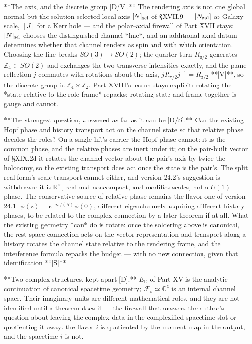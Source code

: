 **The axis, and the discrete group [D/V].** The rendering axis is not one global normal but the solution-selected local axis $[N]_{\rm sel}$ of §XVII.9 — $[N_{\rm gal}]$ at Galaxy scale, $[J]$ for a Kerr hole — and the polar–axial firewall of Part XVII stays: $[N]_{\rm sel}$ chooses the distinguished channel *line*, and an additional axial datum determines whether that channel renders as spin and with which orientation. Choosing the line breaks $SO(3)\to SO(2)$; the quarter turn $R_{\pi/2}$ generates $\mathbb Z_4\subset SO(2)$ and exchanges the two transverse intensities exactly, and the plane reflection $j$ commutes with rotations about the axis, $jR_{\pi/2}j^{-1} = R_{\pi/2}$ **[V]**, so the discrete group is $\mathbb Z_4\times\mathbb Z_2$. Part XVIII's lesson stays explicit: rotating the *state relative to the role frame* repacks; rotating state and frame together is gauge and cannot.

**The strongest question, answered as far as it can be [D/S].** Can the existing Hopf phase and history transport act on the channel state so that relative phase decides the roles? On a single lift's carrier the Hopf phase cannot: it is the common phase, and the relative phases are inert under it; on the pair-built vector of §XIX.2d it rotates the channel vector about the pair's axis by twice the holonomy, so the existing transport does act once the state is the pair's. The split real form's scale transport cannot either, and version 24.2's suggestion is withdrawn: it is $\mathbb R^\times$, real and noncompact, and modifies scales, not a $U(1)$ phase. The conservative source of relative phase remains the flavor one of version 24.1, $\psi(s) = e^{-isf(B)}\psi(0)$, different eigenchannels acquiring different history phases, to be related to the complex connection by a later theorem if at all. What the existing geometry *can* do is rotate: once the soldering above is canonical, the rest-space connection acts on the vector representation and transport along a history rotates the channel state relative to the rendering frame, and the interference formula repacks the budget — with no new connection, given that identification **[S]**.

**Two complex structures, kept apart [D].** $E_{\mathbb C}$ of Part XV is the analytic continuation of canonical spacetime geometry; $\mathcal F_x\simeq\mathbb C^3$ is an internal channel space. Their imaginary units are different mathematical roles, and they are not identified until a theorem does it — the firewall that answers the author's question about leaving the complex data in the complexified-spacetime slot or quotienting it away: the flavor $i$ is quotiented by the moment map in the output, and the spacetime $i$ is not.

